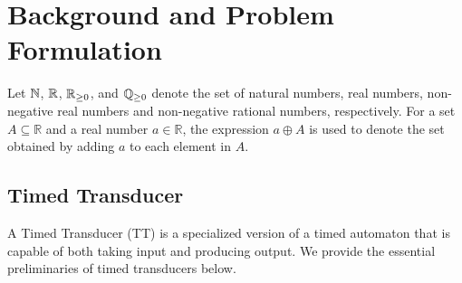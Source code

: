 \section{Background and Problem Formulation}
\label{sec:Preliminaries and notations}
Let $\mathbb{N}$, $\mathbb{R}$, $\mathbb{R}_{\ge 0}$, and $\mathbb{Q}_{\ge 0}$ denote the set of natural numbers, real numbers, non-negative real numbers and non-negative rational numbers, respectively. 
For a set $A \subseteq \mathbb{R}$ and a real number $a \in \mathbb{R}$, the expression $a \oplus A$ is used to denote the set obtained by adding $a$ to each element in $A$. %


    \subsection{Timed Transducer}\label{sec:Timed Transducer}
        A Timed Transducer (TT) is a specialized version of a timed automaton \cite{alur1994theory} that is capable of both taking input and producing output. We provide the essential preliminaries of timed transducers below.

